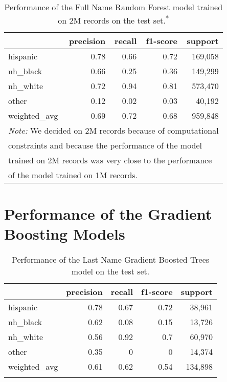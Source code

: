 \documentclass[12pt, letterpaper]{article}
\begin{document}
\begin{table}[h!]
\centering
\caption{Performance of the Full Name Random Forest model trained on 2M records on the test set.\textsuperscript{*}}
\begin{tabular}{lrrrr}
\hline
              &   precision &   recall &   f1-score &   support \\
\hline
 hispanic     &        0.78 &     0.66 &       0.72 &    169,058 \\
 nh\_black     &        0.66 &     0.25 &       0.36 &    149,299 \\
 nh\_white     &        0.72 &     0.94 &       0.81 &    573,470 \\
 other        &        0.12 &     0.02 &       0.03 &     40,192 \\
 weighted\_avg &        0.69 &     0.72 &       0.68 &    959,848 \\
\hline
\multicolumn{5}{l}{\textit{Note:} We decided on 2M records because of computational}\\
\multicolumn{5}{l}{constraints and because the performance of the model}\\
\multicolumn{5}{l}{trained on 2M records was very close to the performance}\\
\multicolumn{5}{l}{of the model trained on 1M records.}
\end{tabular}
\label{table:rf_full_name_2m}
\end{table}

\clearpage
\section{Performance of the Gradient Boosting Models}\label{gbm_perf}

\begin{table}[h!]
\centering
\caption{Performance of the Last Name Gradient Boosted Trees model on the test set.}
\begin{tabular}{lrrrr}
\hline
              &   precision &   recall &   f1-score &   support \\
\hline
 hispanic     &        0.78 &     0.67 &       0.72 &     38,961 \\
 nh\_black     &        0.62 &     0.08 &       0.15 &     13,726 \\
 nh\_white     &        0.56 &     0.92 &       0.7  &     60,970 \\
 other        &        0.35 &     0    &       0    &     14,374 \\
 weighted\_avg &        0.61 &     0.62 &       0.54 &    134,898 \\
\hline
\label{table:gb_last_name}
\end{tabular}
\end{table}
\end{document}
